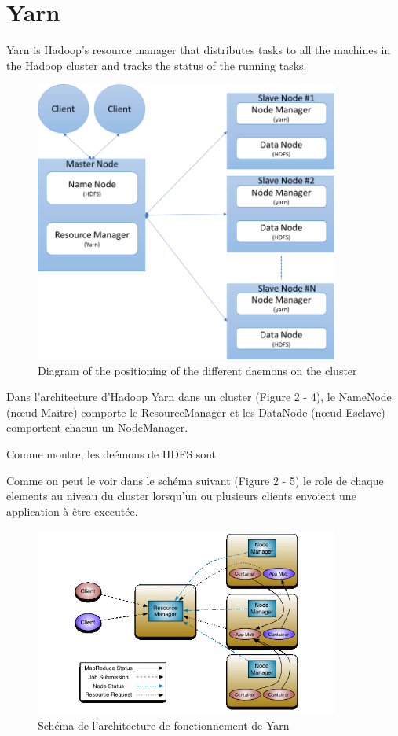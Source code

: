 \documentclass[12pt,english]{book}
\begin{document}
\section{Yarn}

Yarn is Hadoop's resource manager that distributes tasks to all the machines in the Hadoop cluster and tracks the status of the running tasks.

\begin{figure}[ht]
	\centering
	\includegraphics[width=10cm]{demonsSchema}
	\caption{Diagram of the positioning of the different daemons on the cluster}
\end{figure}

Dans l’architecture d’Hadoop Yarn dans un cluster (Figure 2 - 4), le NameNode (nœud Maitre) comporte le ResourceManager et les DataNode (nœud Esclave) comportent chacun un NodeManager.

Comme montre, les deémons de HDFS sont

Comme on peut le voir dans le schéma suivant (Figure 2 - 5) le role de chaque elements au niveau du cluster lorsqu’un ou plusieurs clients envoient une application à être executée.

\begin{figure}[ht]
	\centering
	\includegraphics[width=10cm]{yarnArch}
	\caption[Schéma de l'architecture de fonctionnement de Yarn]{Schéma de l'architecture de fonctionnement de Yarn \footnotemark}
\end{figure}
\end{document}

